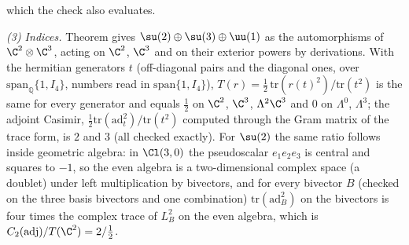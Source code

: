 which the check also evaluates.

\emph{(3) Indices.} Theorem  gives $\su(2) \oplus \su(3) \oplus \uu(1)$ as the automorphisms of $\C^{2}\otimes\C^{3}$, acting on $\C^{2}$, $\C^{3}$ and on their exterior powers by derivations. With the hermitian generators $t$ (off-diagonal pairs and the diagonal ones, over $\mathrm{span}_{\mathbb{Q}}\{1, I_{4}\}$, numbers read in $\mathrm{span}\{1, I_{4}\}$), $T(r) = \tfrac12\,\mathrm{tr}(r(t)^{2})/\mathrm{tr}(t^{2})$ is the same for every generator and equals $\tfrac12$ on $\C^{2}$, $\C^{3}$, $\Lambda^{2}\C^{3}$ and $0$ on $\Lambda^{0}$, $\Lambda^{3}$; the adjoint Casimir, $\tfrac12\mathrm{tr}(\mathrm{ad}_{t}^{2})/\mathrm{tr}(t^{2})$ computed through the Gram matrix of the trace form, is $2$ and $3$ (all checked exactly). For $\su(2)$ the same ratio follows inside geometric algebra: in $\Cl(3,0)$ the pseudoscalar $e_{1}e_{2}e_{3}$ is central and squares to $-1$, so the even algebra is a two-dimensional complex space (a doublet) under left multiplication by bivectors, and for every bivector $B$ (checked on the three basis bivectors and one combination) $\mathrm{tr}(\mathrm{ad}_{B}^{2})$ on the bivectors is four times the complex trace of $L_{B}^{2}$ on the even algebra, which is $C_{2}(\mathrm{adj})/T(\C^{2}) = 2/\tfrac12$.

